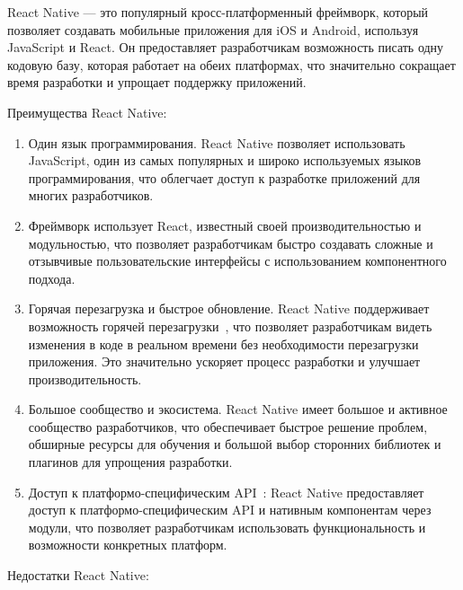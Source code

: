 \documentclass[14pt, russian]{scrartcl}
\begin{document}
React Native --- это популярный кросс-платформенный фреймворк, который позволяет создавать мобильные приложения для iOS и Android, используя JavaScript и React. Он предоставляет разработчикам возможность писать одну кодовую базу, которая работает на обеих платформах, что значительно сокращает время разработки и упрощает поддержку приложений.

Преимущества React Native:

\begin{enumerate}
    \item Один язык программирования. React Native позволяет использовать JavaScript, один из самых популярных и широко используемых языков программирования, что облегчает доступ к разработке приложений для многих разработчиков.
    \item Фреймворк использует React, известный своей производительностью и модульностью, что позволяет разработчикам быстро создавать сложные и отзывчивые пользовательские интерфейсы с использованием компонентного подхода.
    \item Горячая перезагрузка и быстрое обновление. React Native поддерживает возможность горячей перезагрузки~\cite{rnHotReload}, что позволяет разработчикам видеть изменения в коде в реальном времени без необходимости перезагрузки приложения. Это значительно ускоряет процесс разработки и улучшает производительность.
    \item Большое сообщество и экосистема. React Native имеет большое и активное сообщество разработчиков, что обеспечивает быстрое решение проблем, обширные ресурсы для обучения и большой выбор сторонних библиотек и плагинов для упрощения разработки.
    \item Доступ к платформо-специфическим API~\cite{rnPlatform}: React Native предоставляет доступ к платформо-специфическим API и нативным компонентам через модули, что позволяет разработчикам использовать функциональность и возможности конкретных платформ.
\end{enumerate}

Недостатки React Native:
\end{document}
